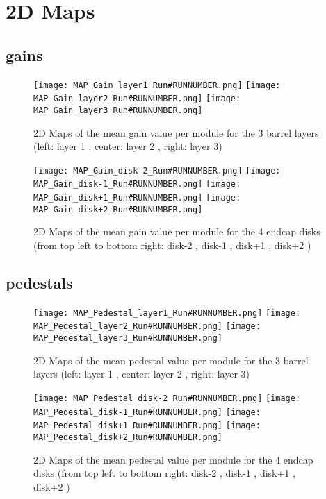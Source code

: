 \documentclass[a4paper,10pt]{article}
\begin{document}
\section{2D Maps\label{sec:maps}}

\subsection{gains}

\begin{figure}[htp]
 \centering
\subfigure
 {\texttt{[image: MAP\_Gain\_layer1\_Run\#RUNNUMBER.png]}}
\subfigure
 {\texttt{[image: MAP\_Gain\_layer2\_Run\#RUNNUMBER.png]}}
\subfigure
 {\texttt{[image: MAP\_Gain\_layer3\_Run\#RUNNUMBER.png]}}
\caption{2D Maps of the mean gain value per module for the 3 barrel layers (left: layer 1 , center: layer 2 , right: layer 3)}
\end{figure}

\begin{figure}[htp]
 \centering
\subfigure
 {\texttt{[image: MAP\_Gain\_disk-2\_Run\#RUNNUMBER.png]}}
\subfigure
 {\texttt{[image: MAP\_Gain\_disk-1\_Run\#RUNNUMBER.png]}}
\subfigure
 {\texttt{[image: MAP\_Gain\_disk+1\_Run\#RUNNUMBER.png]}}
\subfigure
 {\texttt{[image: MAP\_Gain\_disk+2\_Run\#RUNNUMBER.png]}}
\caption{2D Maps of the mean gain value per module for the 4 endcap disks (from top left to bottom right: disk-2 , disk-1 , disk+1 , disk+2 )}
\end{figure}

\pagebreak



\subsection{pedestals}

\begin{figure}[htp]
 \centering
\subfigure
 {\texttt{[image: MAP\_Pedestal\_layer1\_Run\#RUNNUMBER.png]}}
\subfigure
 {\texttt{[image: MAP\_Pedestal\_layer2\_Run\#RUNNUMBER.png]}}
\subfigure
 {\texttt{[image: MAP\_Pedestal\_layer3\_Run\#RUNNUMBER.png]}}
\caption{2D Maps of the mean pedestal value per module for the 3 barrel layers (left: layer 1 , center: layer 2 , right: layer 3)}
\end{figure}

\begin{figure}[htp]
 \centering
\subfigure
 {\texttt{[image: MAP\_Pedestal\_disk-2\_Run\#RUNNUMBER.png]}}
\subfigure
 {\texttt{[image: MAP\_Pedestal\_disk-1\_Run\#RUNNUMBER.png]}}
\subfigure
 {\texttt{[image: MAP\_Pedestal\_disk+1\_Run\#RUNNUMBER.png]}}
\subfigure
 {\texttt{[image: MAP\_Pedestal\_disk+2\_Run\#RUNNUMBER.png]}}
\caption{2D Maps of the mean pedestal value per module for the 4 endcap disks (from top left to bottom right: disk-2 , disk-1 , disk+1 , disk+2 )}
\end{figure}
\end{document}
